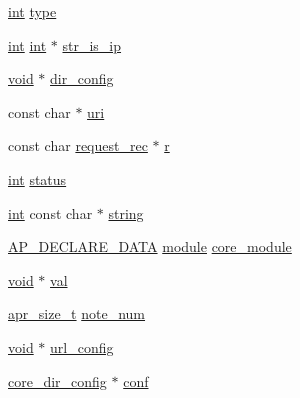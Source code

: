 \begin{DoxyCompactItemize}
\item 
\hyperlink{pcre_8txt_a42dfa4ff673c82d8efe7144098fbc198}{int} \hyperlink{group__APACHE__CORE__HTTPD_gaafc7089562892428c4fcae486f171f5a}{type}
\item 
\hyperlink{pcre_8txt_a42dfa4ff673c82d8efe7144098fbc198}{int} \hyperlink{pcre_8txt_a42dfa4ff673c82d8efe7144098fbc198}{int} $\ast$ \hyperlink{group__APACHE__CORE__HTTPD_ga6eacff0eb4e6a85cd46b4d35635dd64a}{str\+\_\+is\+\_\+ip}
\item 
\hyperlink{group__MOD__ISAPI_gacd6cdbf73df3d9eed42fa493d9b621a6}{void} $\ast$ \hyperlink{group__APACHE__CORE__HTTPD_ga26cd16f35c94a1f60fac284b846e00f2}{dir\+\_\+config}
\item 
const char $\ast$ \hyperlink{group__APACHE__CORE__HTTPD_gaaf802cf1817bf45bcf1a5f266ef18bbd}{uri}
\item 
const char \hyperlink{structrequest__rec}{request\+\_\+rec} $\ast$ \hyperlink{group__APACHE__CORE__HTTPD_ga19dbd0e05eb835cb09e941e25cec2ee4}{r}
\item 
\hyperlink{pcre_8txt_a42dfa4ff673c82d8efe7144098fbc198}{int} \hyperlink{group__APACHE__CORE__HTTPD_ga6e27f49150e9a14580fb313cc2777e00}{status}
\item 
\hyperlink{pcre_8txt_a42dfa4ff673c82d8efe7144098fbc198}{int} const char $\ast$ \hyperlink{group__APACHE__CORE__HTTPD_ga9a99e7b8a7037d0b19e8e146e661cddd}{string}
\item 
\hyperlink{ap__config_8h_a0bb4c3adf74510a0dcdad5b125725fe0}{A\+P\+\_\+\+D\+E\+C\+L\+A\+R\+E\+\_\+\+D\+A\+TA} \hyperlink{group__APACHE__CORE__CONFIG_ga0ea4f633a5f9f88e1603aaeb1f2b2e69}{module} \hyperlink{group__APACHE__CORE__HTTPD_gafebd5dacd393edc6b65481d68544c59a}{core\+\_\+module}
\item 
\hyperlink{group__MOD__ISAPI_gacd6cdbf73df3d9eed42fa493d9b621a6}{void} $\ast$ \hyperlink{group__APACHE__CORE__HTTPD_gab03f36f103bdec81305fd301f1f93885}{val}
\item 
\hyperlink{group__apr__platform_gaaa72b2253f6f3032cefea5712a27540e}{apr\+\_\+size\+\_\+t} \hyperlink{group__APACHE__CORE__HTTPD_gacddfca39f0faac5c30095a9ffbaf9a86}{note\+\_\+num}
\item 
\hyperlink{group__MOD__ISAPI_gacd6cdbf73df3d9eed42fa493d9b621a6}{void} $\ast$ \hyperlink{group__APACHE__CORE__HTTPD_ga055528560a866ebb58a84ff7eaf9ea1f}{url\+\_\+config}
\item 
\hyperlink{structcore__dir__config}{core\+\_\+dir\+\_\+config} $\ast$ \hyperlink{group__APACHE__CORE__HTTPD_ga7be6dfd9155648f64d6e9abcd78c38cd}{conf}

\end{DoxyCompactItemize}
